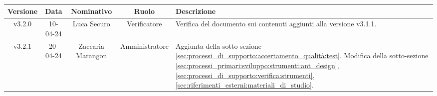 \newpage
\begin{table}[h]
    \centering
    \renewcommand\tabularxcolumn[1]{m{#1}} %
    \renewcommand{\arraystretch}{1.5}
    \begin{tabularx}{0.98\textwidth}
        {c|c|c|c|>{\centering\arraybackslash}X}
        \rowcolor{black}
        \textbf{\color{white} Versione} & \textbf{\color{white} Data} & \textbf{\color{white} Nominativo} & \textbf{\color{white} Ruolo} & \textbf{\color{white} Descrizione} \\ 
        \hline
        v3.2.0 & 10-04-24 & Luca Securo & Verificatore & Verifica del documento sui contenuti aggiunti alla versione v3.1.1.\\
        v3.2.1 & 20-04-24 & Zaccaria Marangon & Amministratore & Aggiunta della sotto-sezione \ref{sec:processi_di_supporto:accertamento_qualità:test}. Modifica della sotto-sezione \ref{sec:processi_primari:sviluppo:strumenti:ant_design}, \ref{sec:processi_di_supporto:verifica:strumenti}, \ref{sec:riferimenti_esterni:materiali_di_studio}.\\
        \hline
    \end{tabularx}
\end{table}
